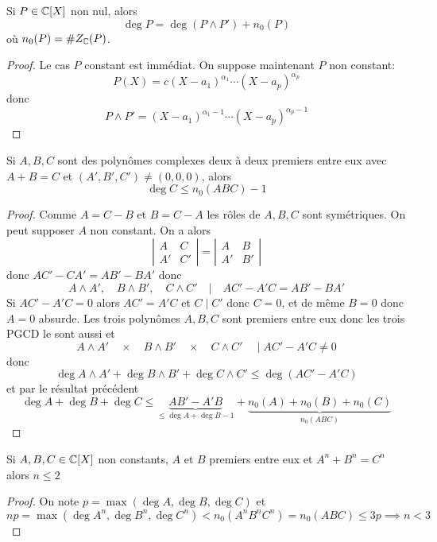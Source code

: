 \begin{lmm}
    Si $P\in\mathbb C[X]$ non nul, alors \[
        \deg P=\deg \left(P\land P'\right)+n_0(P)
    \]
    où $n_0(P)=\#Z_{\mathbb C}(P)$.
\end{lmm}

\begin{proof}
    Le cas $P$ constant est immédiat. On suppose maintenant $P$ non constant: \[
        P(X)=c(X-a_1)^{\alpha_1}\cdots (X-a_p)^{\alpha_p}
    \]
    donc \[
        P\land P'=(X-a_1)^{\alpha_1-1}\cdots (X-a_p)^{\alpha_p-1}
    \]
\end{proof}

\begin{thm}[Mason]
    Si $A, B, C$ sont des polynômes complexes deux à deux premiers entre eux avec $A+B=C$ et $(A', B', C')\neq (0, 0, 0)$, alors \[
        \deg C\leq n_0(ABC)-1
    \]
\end{thm}

\begin{proof}
Comme $A=C-B$ et $B=C-A$ les rôles de $A, B, C$ sont symétriques. On peut supposer $A$ non constant. On a alors \[
    \left|\begin{matrix}A&C\\A'&C'\end{matrix}\right|=\left|\begin{matrix}A&B\\A'&B'\end{matrix}\right|
\]
donc $AC'-CA'=AB'-BA'$ donc \[
    A\land A', \quad B\land B', \quad C\land C'\quad\Big|\quad AC'-A'C=AB'-BA'
\]
Si $AC'-A'C=0$ alors $AC'=A'C$ et $C\;|\;C'$ donc $C=0$, et de même $B=0$ donc $A=0$ absurde. Les trois polynômes $A, B, C$ sont premiers entre eux donc les trois PGCD le sont aussi et \[
    A\land A' \quad \times \quad B\land B'\quad \times \quad C\land C'\quad \;\Big|\; AC'-A'C\neq 0
\]
donc \[
    \deg A\land A' + \deg B\land B'+\deg C\land C'\leq \deg(AC'-A'C)
\]
et par le résultat précédent \[
    \deg A+\deg B+\deg C \leq \underbrace{AB'-A'B}_{\leq \deg A+\deg B-1}+ \underbrace{n_0(A)+n_0(B)+n_0(C)}_{n_0(ABC)}
\]
\end{proof}

\begin{thm}[Fermat]
    Si $A, B, C\in\mathbb C[X]$ non constants, $A$ et $B$ premiers entre eux et $A^n+B^n=C^n$ alors $n\leq 2$
\end{thm}

\begin{proof}
On note $p=\max (\deg A, \deg B, \deg C)$ et \[
    np=\max(\deg A^n, \deg B^n, \deg C^n)< n_0(A^nB^nC^n)=n_0(ABC)\leq 3p \implies n<3
\]
\end{proof}

